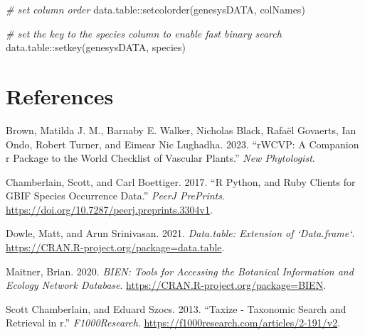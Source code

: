 \documentclass[
]{article}
\newenvironment{Shaded}{\begin{snugshade}}{\end{snugshade}}
\newcommand{\CommentTok}[1]{\textcolor[rgb]{0.56,0.35,0.01}{\textit{#1}}}
\newcommand{\FunctionTok}[1]{\textcolor[rgb]{0.00,0.00,0.00}{#1}}
\newcommand{\NormalTok}[1]{#1}
\newcommand{\SpecialCharTok}[1]{\textcolor[rgb]{0.00,0.00,0.00}{#1}}
\newcommand{\StringTok}[1]{\textcolor[rgb]{0.31,0.60,0.02}{#1}}
\newlength{\cslhangindent}
\newlength{\cslentryspacingunit} %
\newenvironment{CSLReferences}[2] %
 {%
  \setlength{\parindent}{0pt}
  \ifodd #1
  \let\oldpar\par
  \def\par{\hangindent=\cslhangindent\oldpar}
  \fi
  \setlength{\parskip}{#2\cslentryspacingunit}
 }%
 {}
\begin{document}
\begin{Shaded}
\begin{Highlighting}[]
\CommentTok{\# set column order}
\NormalTok{data.table}\SpecialCharTok{::}\FunctionTok{setcolorder}\NormalTok{(genesysDATA, colNames)}

\CommentTok{\# set the key to the species column to enable fast binary search}
\NormalTok{data.table}\SpecialCharTok{::}\FunctionTok{setkey}\NormalTok{(genesysDATA, }\StringTok{\textquotesingle{}species\textquotesingle{}}\NormalTok{)}
\end{Highlighting}
\end{Shaded}

\hypertarget{references}{%
\section*{References}\label{references}}

\hypertarget{refs}{}
\begin{CSLReferences}{1}{0}
\leavevmode{}%
Brown, Matilda J. M., Barnaby E. Walker, Nicholas Black, Rafaël
Govaerts, Ian Ondo, Robert Turner, and Eimear Nic Lughadha. 2023.
{``rWCVP: A Companion r Package to the World Checklist of Vascular
Plants.''} \emph{New Phytologist}.

\leavevmode{}%
Chamberlain, Scott, and Carl Boettiger. 2017. {``R Python, and Ruby
Clients for GBIF Species Occurrence Data.''} \emph{PeerJ PrePrints}.
\url{https://doi.org/10.7287/peerj.preprints.3304v1}.

\leavevmode{}%
Dowle, Matt, and Arun Srinivasan. 2021. \emph{Data.table: Extension of
`Data.frame`}. \url{https://CRAN.R-project.org/package=data.table}.

\leavevmode{}%
Maitner, Brian. 2020. \emph{BIEN: Tools for Accessing the Botanical
Information and Ecology Network Database}.
\url{https://CRAN.R-project.org/package=BIEN}.

\leavevmode{}%
Scott Chamberlain, and Eduard Szocs. 2013. {``Taxize - Taxonomic Search
and Retrieval in r.''} \emph{F1000Research}.
\url{https://f1000research.com/articles/2-191/v2}.

\end{CSLReferences}
\end{document}
